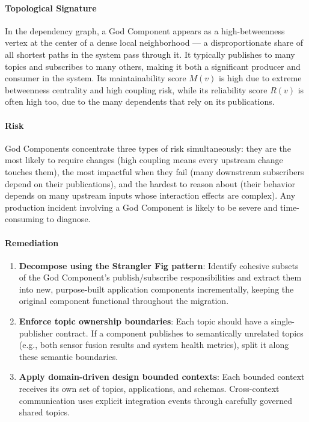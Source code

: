\documentclass[11pt]{article}
\begin{document}
\paragraph{Topological Signature}
In the dependency graph, a God Component appears as a high-betweenness vertex at the center of a dense local neighborhood --- a disproportionate share of all shortest paths in the system pass through it. It typically publishes to many topics and subscribes to many others, making it both a significant producer and consumer in the system. Its maintainability score $M(v)$ is high due to extreme betweenness centrality and high coupling risk, while its reliability score $R(v)$ is often high too, due to the many dependents that rely on its publications.

\paragraph{Risk}
God Components concentrate three types of risk simultaneously: they are the most likely to require changes (high coupling means every upstream change touches them), the most impactful when they fail (many downstream subscribers depend on their publications), and the hardest to reason about (their behavior depends on many upstream inputs whose interaction effects are complex). Any production incident involving a God Component is likely to be severe and time-consuming to diagnose.

\paragraph{Remediation}
\begin{enumerate}[leftmargin=*]
\item \textbf{Decompose using the Strangler Fig pattern}: Identify cohesive subsets of the God Component's publish/subscribe responsibilities and extract them into new, purpose-built application components incrementally, keeping the original component functional throughout the migration.
\item \textbf{Enforce topic ownership boundaries}: Each topic should have a single-publisher contract. If a component publishes to semantically unrelated topics (e.g., both sensor fusion results and system health metrics), split it along these semantic boundaries.
\item \textbf{Apply domain-driven design bounded contexts}: Each bounded context receives its own set of topics, applications, and schemas. Cross-context communication uses explicit integration events through carefully governed shared topics.
\end{enumerate}
\end{document}
